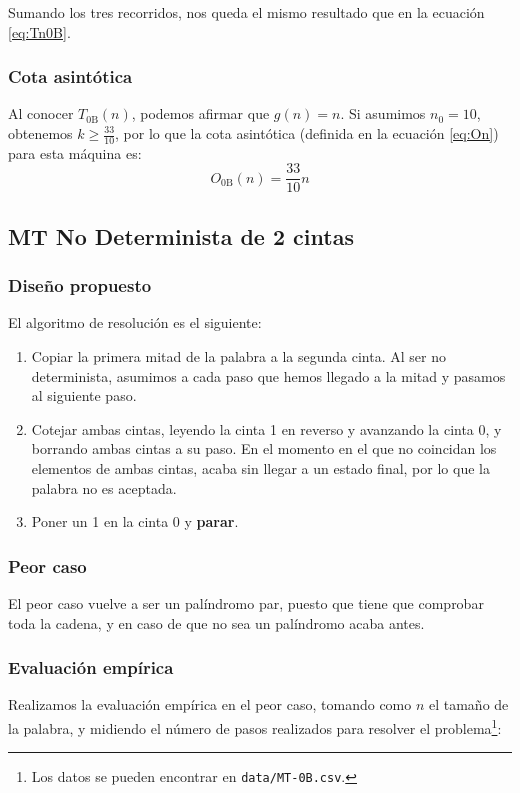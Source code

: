 Sumando los tres recorridos, nos queda el mismo resultado que en la ecuación \ref{eq:Tn0B}.


\subsubsection*{Cota asintótica}
Al conocer $T_{\mathrm{0B}}(n)$, podemos afirmar que $g(n) = n$. Si asumimos $n_0 = 10$, obtenemos $k \geq \frac{33}{10}$, por lo que la cota asintótica (definida en la ecuación \ref{eq:On}) para esta máquina es:
\begin{equation}
    O_{\mathrm{0B}}(n) = \frac{33}{10} n
\end{equation}




\subsection{MT No Determinista de 2 cintas}

\subsubsection*{Diseño propuesto}
El algoritmo de resolución es el siguiente:

\begin{enumerate}
    \item Copiar la primera mitad de la palabra a la segunda cinta. Al ser no determinista, asumimos a cada paso que hemos llegado a la mitad y pasamos al siguiente paso.
    \item Cotejar ambas cintas, leyendo la cinta 1 en reverso y avanzando la cinta 0, y borrando ambas cintas a su paso. En el momento en el que no coincidan los elementos de ambas cintas, acaba sin llegar a un estado final, por lo que la palabra no es aceptada.
    \item Poner un 1 en la cinta 0 y \textbf{parar}.
\end{enumerate}

\subsubsection*{Peor caso}
El peor caso vuelve a ser un palíndromo par, puesto que tiene que comprobar toda la cadena, y en caso de que no sea un palíndromo acaba antes.


\subsubsection*{Evaluación empírica}
Realizamos la evaluación empírica en el peor caso, tomando como $n$ el tamaño de la palabra, y midiendo el número de pasos realizados para resolver el problema\footnote{Los datos se pueden encontrar en \texttt{data/MT-0B.csv}.}:

